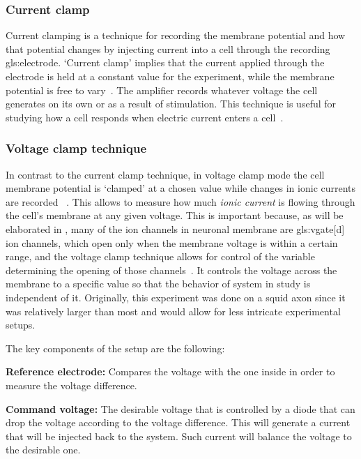 \documentclass[class={myRUCProject}, crop=false]{standalone}
\begin{document}
\subsubsection{Current clamp}\label{sec:Cclamp}

Current clamping is a technique for recording the membrane potential and how that potential changes by injecting current into a cell through the recording \gls{gls:electrode}.  
`Current clamp' implies that the current applied through the electrode is held at a constant value for the experiment, while the membrane potential is free to vary~\cite{Hammond2015ch4}. The amplifier records whatever voltage the cell generates on its own or as a result of stimulation. 
This technique is useful for studying how a cell responds when electric current enters a cell~\cite{Hammond2015ch4}.

\subsubsection{Voltage clamp technique}\label{sec:Vclamp}
 
In contrast to the current clamp technique, in voltage clamp mode the cell membrane potential is `clamped' at a chosen value while changes in ionic currents are recorded ~\cite{Hammond2015ch4}. 
This allows to measure how much \textit{ionic current} is flowing through the cell's membrane at any given voltage. 
This is important because, as will be elaborated in , many of the ion channels in neuronal membrane are \gls{gls:vgate}[d] ion channels, which open only when the membrane voltage is within a certain range, and the voltage clamp technique allows for control of the variable determining the opening of those channels~\cite{Hammond2015ch4}. It controls the voltage across the membrane to a specific value so that the behavior of system in study is independent of it. Originally, this experiment was done on a squid axon since it was relatively larger than most and would allow for less intricate experimental setups.

The key components of the setup are the following:

\textbf{ Reference electrode:} Compares the voltage with the one inside in order to measure the voltage difference.

\textbf{ Command voltage:} The desirable voltage that is controlled by a diode that can drop the voltage according to the voltage difference. This will generate a current that will be injected back to the system. Such current will balance the voltage to the desirable one.
\end{document}
